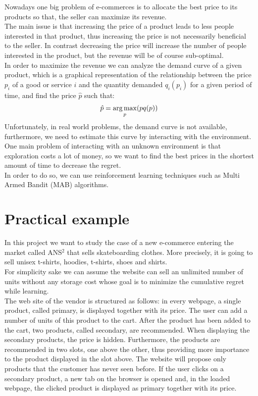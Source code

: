 Nowadays one big problem of e-commerces is to allocate the best price to its products so that,
the seller can maximize its revenue.\\
The main issue is that increasing the price of a product leads to less people interested in that product, thus
increasing the price is not necessarily beneficial to the seller. In contrast decreasing the price will increase the number
of people interested in the product, but the revenue will be of course sub-optimal.\\
In order to maximize the revenue we can analyze the demand curve of a given product, which is
a graphical representation of the relationship between the price $p_i$ of a good or service $i$ and the quantity demanded $q_i(p_i)$
for a given period of time, and find the price $\hat{p}$ such that:
\begin{align*}
    \hat{p} = \operatorname*{arg\,max}_p(pq(p))
\end{align*}
Unfortunately, in real world problems, the demand curve is not available, furthermore, we need to estimate this curve by interacting with the environment. One main problem of interacting with an unknown environment is that exploration costs a lot of money, so we want to find the best prices in the shortest amount of time to decrease the regret. \\
In order to do so, we can use reinforcement learning techniques such as Multi Armed Bandit (MAB) algorithms.
\section{Practical example}
In this project we want to study the case of a new e-commerce entering the market called ANS$^2$ that sells
skateboarding clothes. More precisely, it is going to sell unisex t-shirts, hoodies, t-shirts, shoes and shirts.\\ For simplicity sake we can assume the website can sell an unlimited number of units without any storage cost whose goal is to minimize the cumulative regret while learning.\\
The web site of the vendor is structured as follows: in every webpage, a single product, called primary, is displayed together with its price. The user can add a number of units of this product to the cart. After the product has been added to the cart, two products, called secondary, are recommended. When displaying the secondary products, the price is hidden. Furthermore, the products are recommended in two slots, one above the other, thus providing more importance to the product displayed in the slot above. The website will propose only products that the customer has never seen before.
If the user clicks on a secondary product, a new tab on the browser is opened and, in the loaded webpage, the clicked product is displayed as primary together with its price.\\

